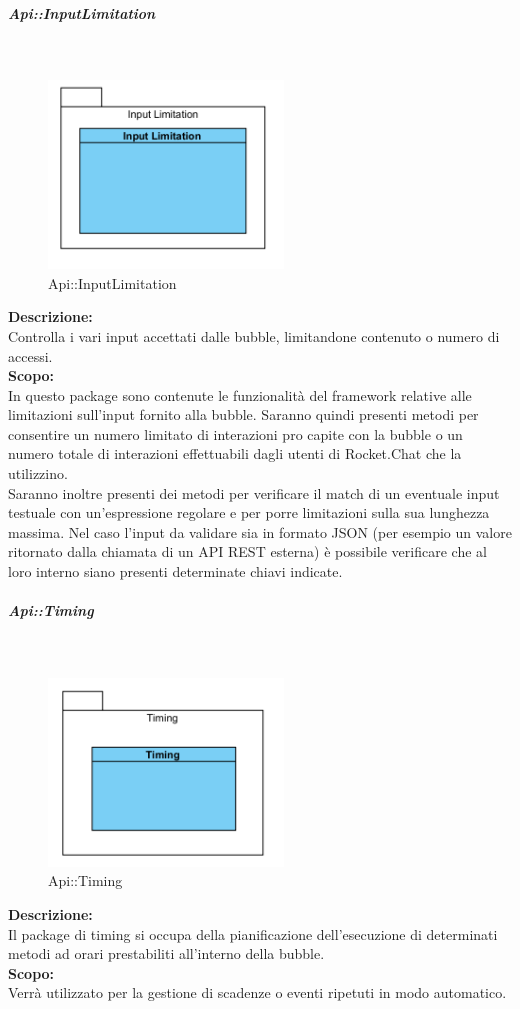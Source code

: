 \begin{samepage}
\subparagraph{Api\-::Input\-Limitation}\label{api-limiti}\mbox{}\\
\nopagebreak
\begin{figure}[H]
	\centering
	\includegraphics[height=5cm]{diagrammi_img/classi_e_package/api_limitinput.png}
	\caption{Api\-::Input\-Limitation}
\end{figure}
\end{samepage}
\textbf{Descrizione:}\\
Controlla i vari input accettati dalle bubble, limitandone contenuto o numero di accessi.\\
\textbf{Scopo:}\\
In questo package sono contenute le funzionalità del framework relative alle limitazioni sull'input fornito alla bubble. Saranno quindi presenti metodi per consentire un numero limitato di interazioni pro capite con la bubble o un numero totale di interazioni effettuabili dagli utenti di Rocket.Chat che la utilizzino.\\
Saranno inoltre presenti dei metodi per verificare il match di un eventuale input testuale con un'espressione regolare e per porre limitazioni sulla sua lunghezza massima. Nel caso l'input da validare sia in formato JSON (per esempio un valore ritornato dalla chiamata di un API REST esterna) è possibile verificare che al loro interno siano presenti determinate chiavi indicate.

\begin{samepage}
\subparagraph{Api\-::Timing}\label{api-timing}\mbox{}\\
\nopagebreak
\begin{figure}[H]
	\centering
	\includegraphics[height=5cm]{diagrammi_img/classi_e_package/api_timing.png}
	\caption{Api\-::Timing}
\end{figure}
\end{samepage}
\textbf{Descrizione:}\\
Il package di timing si occupa della pianificazione dell'esecuzione di determinati metodi ad orari prestabiliti all'interno della bubble.\\
\textbf{Scopo:}\\
Verrà utilizzato per la gestione di scadenze o eventi ripetuti in modo automatico.

